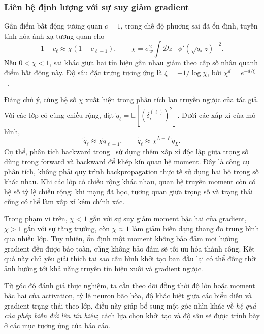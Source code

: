 \documentclass[12pt]{article}
\begin{document}
\subsubsection{Liên hệ định lượng với sự suy giảm gradient}
Gần điểm bất động tương quan $c=1$, trong chế độ phương sai đã ổn định, tuyến tính hóa ánh xạ tương quan cho
\begin{equation}
 1-c_\ell\approx\chi(1-c_{\ell-1}),\qquad
 \chi=\sigma_w^2\int\mathcal Dz\,
 \left[\phi'\!\left(\sqrt{q_*}z\right)\right]^2.
 \label{eq:long-chi}
\end{equation}
Nếu $0<\chi<1$, sai khác giữa hai tín hiệu gần nhau giảm theo cấp số nhân quanh điểm bất động này. Độ sâu đặc trưng tương ứng là $\xi=-1/\log\chi$, bởi $\chi^d=e^{-d/\xi}$~\cite[\S2--3]{long-schoenholz2017}.

Đáng chú ý, cùng hệ số $\chi$ xuất hiện trong phân tích lan truyền ngược của tác giả. Với các lớp có cùng chiều rộng, đặt $\widetilde q_\ell=\mathbb E[(\delta_i^{(\ell)})^2]$. Dưới các xấp xỉ của mô hình,
\begin{equation}
 \widetilde q_\ell\approx\chi\widetilde q_{\ell+1},\qquad
 \widetilde q_\ell\approx\chi^{L-\ell}\widetilde q_L.
 \label{eq:long-mf-backward}
\end{equation}
Cụ thể, phân tích backward trong~\cite[\S4]{long-schoenholz2017} sử dụng thêm xấp xỉ độc lập giữa trọng số dùng trong forward và backward để khép kín quan hệ moment. Đây là công cụ phân tích, không phải quy trình backpropagation thực tế sử dụng hai bộ trọng số khác nhau. Khi các lớp có chiều rộng khác nhau, quan hệ truyền moment còn có hệ số tỷ lệ chiều rộng; khi mạng đã học, tương quan giữa trọng số và trạng thái cũng có thể làm xấp xỉ kém chính xác.

Trong phạm vi trên, $\chi<1$ gắn với sự suy giảm moment bậc hai của gradient, $\chi>1$ gắn với sự tăng trưởng, còn $\chi\approx1$ làm giảm biến dạng thang đo trung bình qua nhiều lớp. Tuy nhiên, ổn định một moment không bảo đảm mọi hướng gradient đều được bảo toàn, cũng không bảo đảm sẽ tối ưu hóa thành công. Kết quả này chủ yếu giải thích tại sao cấu hình khởi tạo ban đầu lại có thể đồng thời ảnh hưởng tới khả năng truyền tín hiệu xuôi và gradient ngược.

Từ góc độ đánh giá thực nghiệm, ta cần theo dõi đồng thời độ lớn hoặc moment bậc hai của activation, tỷ lệ neuron bão hòa, độ khác biệt giữa các biểu diễn và gradient trạng thái theo lớp, điều này giúp bổ sung một góc nhìn khác về \emph{hệ quả của phép biến đổi lên tín hiệu}; cách lựa chọn khởi tạo và độ sâu sẽ được trình bày ở các mục tương ứng của báo cáo.
\end{document}
